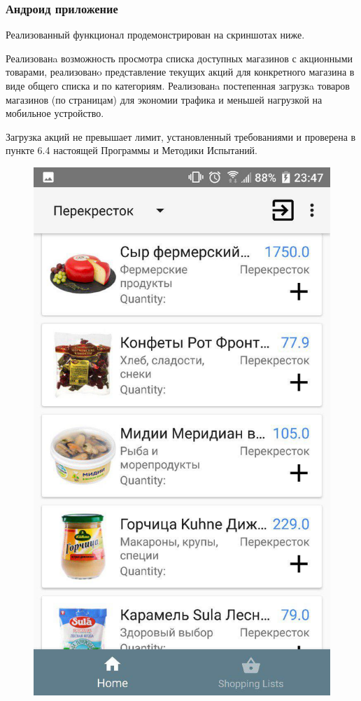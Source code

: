 \subsubsection{Андроид приложение}
Реализованный функционал продемонстрирован на скриншотах ниже.

Реализованa возможность просмотра списка доступных магазинов с акционными
товарами, реализованo представление текущих акций для конкретного магазина в
виде общего списка и по категориям. Реализованa постепенная загрузкa товаров
магазинов (по страницам) для экономии трафика и меньшей нагрузкой на мобильное
устройство.

Загрузка акций не превышает лимит, установленный требованиями и проверена в пункте 6.4 настоящей Программы и Методики Испытаний.

\begin{figure}[h!]
    \centering
    \includegraphics[height=0.38\textheight]{./screenshots/3/home.jpg}

\end{figure}
